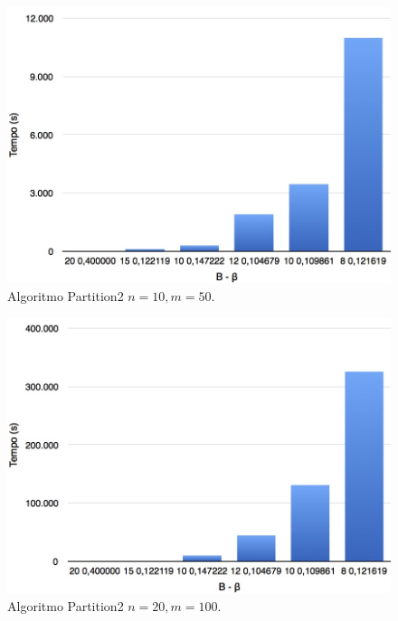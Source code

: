 \begin{figure}[h!]
	\vspace*{1cm}
	\centering
	\includegraphics[scale=.3]{img/Bbeta/10_50.jpg}
	\caption{Algoritmo Partition2 $n = 10, m = 50$.}
\end{figure}
\begin{figure}[h!]
	\vspace*{1cm}
	\centering
	\includegraphics[scale=.3]{img/Bbeta/20_100.jpg}
	\caption{Algoritmo Partition2 $n = 20, m = 100$.}
\end{figure}
